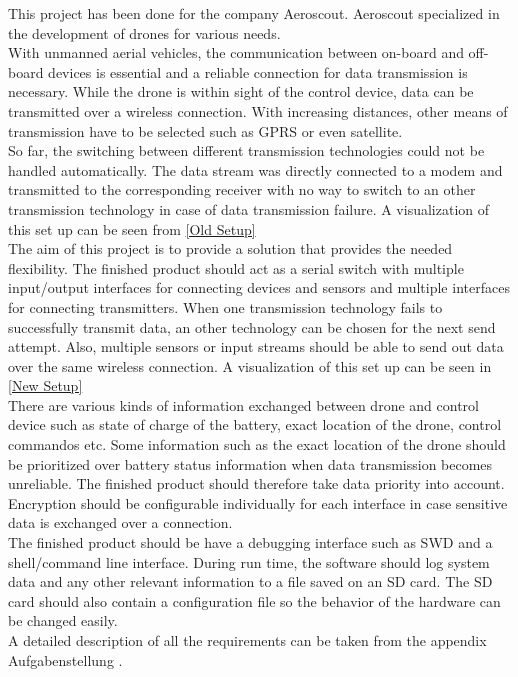 %
\label{sec:txtAufgabenstellung}
This project has been done for the company Aeroscout. Aeroscout specialized in the development of drones for various needs. \\
With unmanned aerial vehicles, the communication between on-board and off-board devices is essential and a reliable connection for data transmission is necessary. While the drone is within sight of the control device, data can be transmitted over a wireless connection. With increasing distances, other means of transmission have to be selected such as GPRS or even satellite.\\
So far, the switching between different transmission technologies could not be handled automatically. The data stream was directly connected to a modem and transmitted to the corresponding receiver with no way to switch to an other transmission technology in case of data transmission failure. A visualization of this set up can be seen from \autoref{Old Setup}\\
%
The aim of this project is to provide a solution that provides the needed flexibility. The finished product should act as a serial switch with multiple input/output interfaces for connecting devices and sensors and multiple interfaces for connecting transmitters. When one transmission technology fails to successfully transmit data, an other technology can be chosen for the next send attempt. Also, multiple sensors or input streams should be able to send out data over the same wireless connection. A visualization of this set up can be seen in \autoref{New Setup}\\
%
There are various kinds of information exchanged between drone and control device such as state of charge of the battery, exact location of the drone, control commandos etc. Some information such as the exact location of the drone should be prioritized over battery status information when data transmission becomes unreliable. The finished product should therefore take data priority into account. \\
Encryption should be configurable individually for each interface in case sensitive data is exchanged over a connection. \\
The finished product should be have a debugging interface such as SWD and a shell/command line interface. During run time, the software should log system data and any other relevant information to a file saved on an SD card. The SD card should also contain a configuration file so the behavior of the hardware can be changed easily. \\
A detailed description of all the requirements can be taken from the appendix Aufgabenstellung .